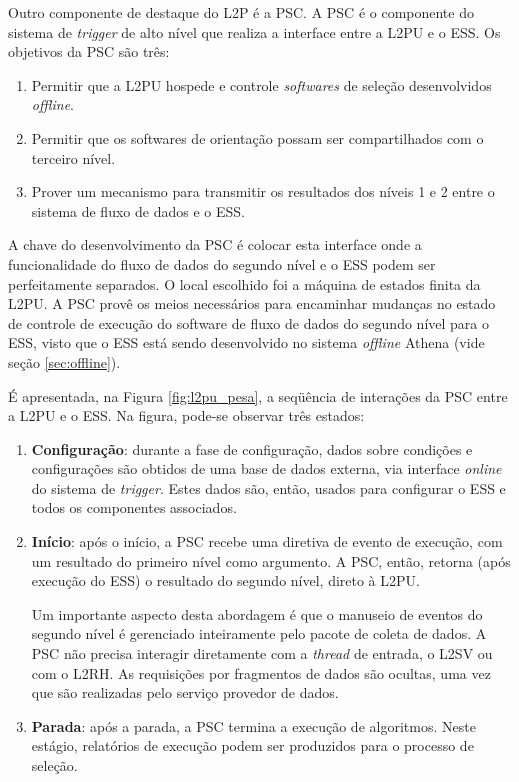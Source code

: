 Outro componente de destaque do L2P é a PSC. A PSC é o componente do sistema de \emph{trigger} de alto nível que realiza a interface entre a L2PU e o ESS. Os objetivos da PSC são três:

\begin{enumerate}

\item Permitir que a L2PU hospede e controle \emph{softwares} de seleção desenvolvidos \emph{offline}.

\item Permitir que os softwares de orientação possam ser compartilhados com o terceiro nível.

\item Prover um mecanismo para transmitir os resultados dos níveis 1 e 2 entre o sistema de fluxo de dados e o ESS.

\end{enumerate}

A chave do desenvolvimento da PSC é colocar esta interface onde a funcionalidade do fluxo de dados do segundo nível e o ESS podem ser perfeitamente separados. O local escolhido foi a máquina de estados finita da L2PU. A PSC provê os meios necessários para encaminhar mudanças no estado de controle de execução do software de fluxo de dados do segundo nível para o ESS, visto que o ESS está sendo desenvolvido no sistema \emph{offline} Athena (vide seção \ref{sec:offline}).


É apresentada, na Figura \ref{fig:l2pu_pesa}, a seqüência de interações da PSC entre a L2PU e o ESS. Na figura, pode-se observar três estados: 

\begin{enumerate}

\item \textbf{Configuração}: durante a fase de configuração, dados sobre condições e configurações são obtidos de uma base de dados externa, via interface \emph{online} do sistema de \emph{trigger}. Estes dados são, então, usados para configurar o ESS e todos os componentes associados.

\item \textbf{Início}: após o início, a PSC recebe uma diretiva de evento de execução, com um resultado do primeiro nível como argumento. A PSC, então, retorna (após execução do ESS) o resultado do segundo nível, direto à L2PU.

Um importante aspecto desta abordagem é que o manuseio de eventos do segundo nível é gerenciado inteiramente pelo pacote de coleta de dados. A PSC não precisa interagir diretamente com a \emph{thread} de entrada, o L2SV ou com o L2RH. As requisições por fragmentos de dados são ocultas, uma vez que são realizadas pelo serviço provedor de dados.

\item \textbf{Parada}: após a parada, a PSC termina a execução de algoritmos. Neste estágio, relatórios de execução podem ser produzidos para o processo de seleção.

\end{enumerate}


